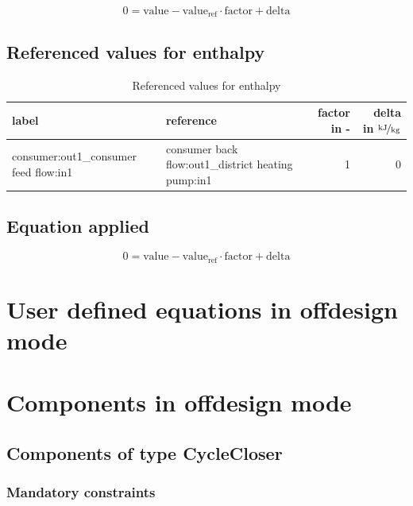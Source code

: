 \begin{equation}
\label{eq:Connection_ref}
0 = \text{value} - \text{value}_\mathrm{ref} \cdot \mathrm{factor} + \text{delta}
\end{equation}

\subsection{Referenced values for enthalpy}

\begin{table}[H]\begin{center}
\begin{tabular}{llrr}
\toprule
                                 label &                                           reference &  factor in - &  delta in $\unitfrac[]{kJ}{kg}$ \\
\midrule
 consumer:out1\_consumer feed flow:in1 &  consumer back flow:out1\_district heating pump:in1 &            1 &                               0 \\
\bottomrule
\end{tabular}
\caption{Referenced values for enthalpy}
\end{center}\end{table}

\subsection{Equation applied}

\begin{equation}
\label{eq:Connection_ref}
0 = \text{value} - \text{value}_\mathrm{ref} \cdot \mathrm{factor} + \text{delta}
\end{equation}

\section{User defined equations in offdesign mode}

\section{Components in offdesign mode}

\subsection{Components of type CycleCloser}

\subsubsection{Mandatory constraints}

